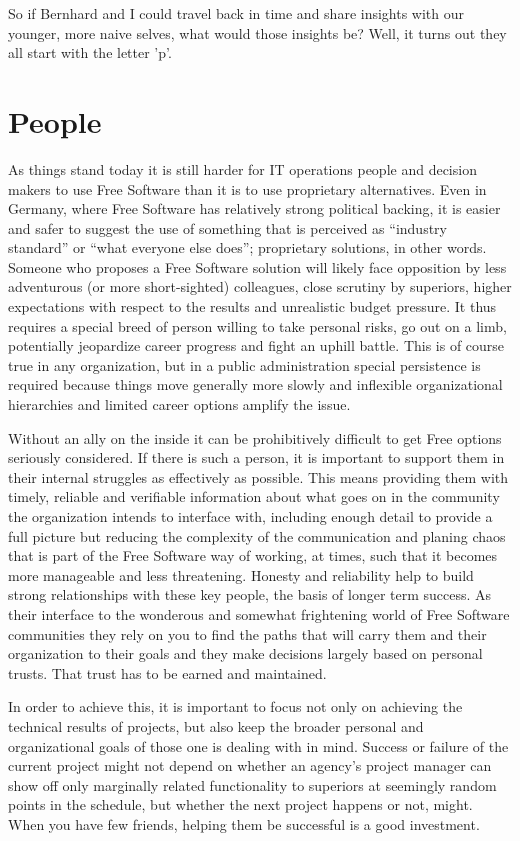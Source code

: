 So if Bernhard and I could travel back in time and share insights with our younger, more
naive selves, what would those insights be? Well, it turns out they all start with the
letter 'p'.

\section*{People}

As things stand today it is still harder for IT operations people and decision
makers to use Free Software than it is to use proprietary alternatives. Even in
Germany, where Free Software has relatively strong political backing, it is
easier and safer to suggest the use of something that is perceived as ``industry
standard'' or ``what everyone else does''; proprietary solutions, in other words.
Someone who proposes a Free Software solution will likely face opposition by
less adventurous (or more short-sighted) colleagues, close scrutiny by
superiors, higher expectations with respect to the results and unrealistic
budget pressure. It thus requires a special breed of person willing to take
personal risks, go out on a limb, potentially jeopardize career progress and
fight an uphill battle. This is of course true in any organization, but in a
public administration special persistence is required because things move
generally more slowly and inflexible organizational hierarchies and limited
career options amplify the issue.

Without an ally on the inside it can be prohibitively difficult to get
Free options seriously considered. If there is such a person, it is important
to support them in their internal struggles as effectively as possible. This
means providing them with timely, reliable and verifiable information about
what goes on in the community the organization intends to interface with,
including enough detail to provide a full picture but reducing the
complexity of the communication and planing chaos that is part of the Free
Software way of working, at times, such that it becomes more manageable and
less threatening. Honesty and reliability help to build strong
relationships with these key people, the basis of longer term success. As
their interface to the wonderous and somewhat frightening world of Free
Software communities they rely on you to find the paths that will carry
them and their organization to their goals and they make decisions largely
based on personal trusts. That trust has to be earned and maintained.

In order to achieve this, it is important to focus not only on achieving
the technical results of projects, but also keep the broader personal and organizational
goals of those one is dealing with in mind. Success or failure of the current
project might not depend on whether an agency's project manager can show off
only marginally related functionality to superiors at seemingly random points
in the schedule, but whether the next project happens or not, might. When you have
few friends, helping them be successful is a good investment.

